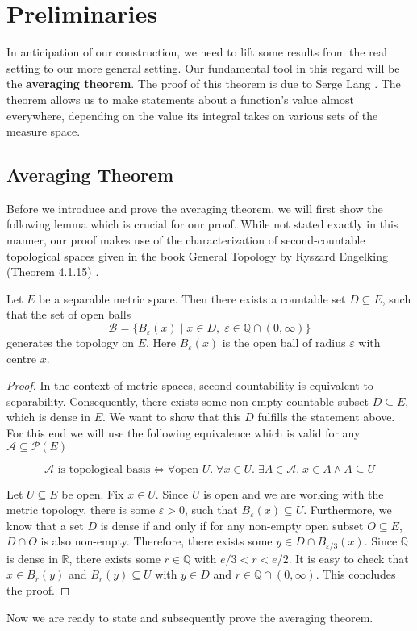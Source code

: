 \section{Preliminaries}

In anticipation of our construction, we need to lift some results from the real setting to our more general setting. Our fundamental tool in this regard will be the \textbf{averaging theorem}. The proof of this theorem is due to Serge Lang \cite{Lang_1993}. The theorem allows us to make statements about a function's value almost everywhere, depending on the value its integral takes on various sets of the measure space.

\subsection{Averaging Theorem}

Before we introduce and prove the averaging theorem, we will first show the following lemma which is crucial for our proof. While not stated exactly in this manner, our proof makes use of the characterization of second-countable topological spaces given in the book General Topology by Ryszard Engelking (Theorem 4.1.15) \cite{engelking_1989}.

\begin{lemma}
Let $E$ be a separable metric space. Then there exists a countable set $D \subseteq E$, such that the set of open balls
\[
	\mathcal{B} = \{ B_\varepsilon(x) \; \vert \; x \in D, \; \varepsilon \in \mathbb{Q} \cap (0, \infty) \}
\]
generates the topology on $E$. Here $B_\varepsilon(x)$ is the open ball of radius $\varepsilon$ with centre $x$.
\end{lemma}

\begin{proof}
In the context of metric spaces, second-countability is equivalent to separability. Consequently, there exists some non-empty countable subset $D \subseteq E$, which is dense in $E$. We want to show that this $D$ fulfills the statement above. For this end we will use the following equivalence which is valid for any $\mathcal{A} \subseteq \mathcal{P}(E)$

\[
	\mathcal{A} \textrm{ is topological basis} \Longleftrightarrow \forall \textrm{open } U.\; \forall x \in U.\; \exists A \in \mathcal{A}.\; x \in A \wedge A \subseteq U
\]

Let $U \subseteq E$ be open. Fix $x \in U$. Since $U$ is open and we are working with the metric topology, there is some $\varepsilon > 0$, such that $B_\varepsilon(x) \subseteq U$. Furthermore, we know that a set $D$ is dense if and only if for any non-empty open subset $O \subseteq E$, $D \cap O$ is also non-empty. Therefore, there exists some $y \in D \cap B_{\varepsilon/3}(x)$. Since $\mathbb{Q}$ is dense in $\mathbb{R}$, there exists some $r \in \mathbb{Q}$ with $e/3 < r < e/2$. It is easy to check that $x \in B_r(y)$ and $B_r(y) \subseteq U$ with $y \in D$ and $r \in \mathbb{Q} \cap (0, \infty)$. This concludes the proof.
\end{proof}
Now we are ready to state and subsequently prove the averaging theorem.

